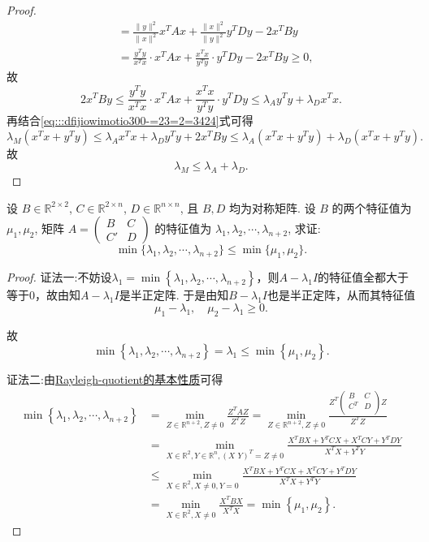 \documentclass[../../main.tex]{subfiles}%
\begin{document}
\begin{proof}
\begin{align*}
&= \frac{\| y \|^2}{\| x \|^2}x^T A x + \frac{\| x \|^2}{\| y \|^2}y^T D y - 2x^T B y \\
&= \frac{y^T y}{x^T x} \cdot x^T A x + \frac{x^T x}{y^T y} \cdot y^T D y - 2x^T B y \geqslant 0,
\end{align*}
故
$$2x^T B y \leqslant \frac{y^T y}{x^T x} \cdot x^T A x + \frac{x^T x}{y^T y} \cdot y^T D y \leqslant \lambda_A y^T y + \lambda_D x^T x.$$
再结合\eqref{eq:::dfijiowimotio300-=23=2=3424}式可得
$$\lambda_M (x^T x + y^T y) \leqslant \lambda_A x^T x + \lambda_D y^T y + 2x^T B y \leqslant \lambda_A (x^T x + y^T y) + \lambda_D (x^T x + y^T y).$$
故
$$\lambda_M \leqslant \lambda_A + \lambda_D.$$
\end{proof}

\begin{example}
设 $B \in \mathbb{R}^{2 \times 2}$, $C \in \mathbb{R}^{2 \times n}$, $D \in \mathbb{R}^{n \times n}$, 且 $B,D$ 均为对称矩阵. 设 $B$ 的两个特征值为 $\mu_1,\mu_2$, 矩阵 $A = \begin{pmatrix} B & C \\ C' & D \end{pmatrix}$ 的特征值为 $\lambda_1,\lambda_2,\cdots,\lambda_{n+2}$, 求证:
$$\min\{\lambda_1,\lambda_2,\cdots,\lambda_{n+2}\} \leqslant \min\{\mu_1,\mu_2\}.$$
\end{example}
\begin{proof}

{\color{blue}证法一:}不妨设$\lambda_1=\min\left\{ \lambda_1,\lambda_2,\cdots,\lambda_{n+2} \right\}$，则$A-\lambda_1 I$的特征值全都大于等于$0$，故由知$A-\lambda_1 I$是半正定阵.
于是由知$B-\lambda_1 I$也是半正定阵，从而其特征值
$$\mu_1-\lambda_1, \quad \mu_2-\lambda_1 \geqslant 0.$$

故
$$\min\left\{ \lambda_1,\lambda_2,\cdots,\lambda_{n+2} \right\}=\lambda_1 \leqslant \min\left\{ \mu_1,\mu_2 \right\}.$$

{\color{blue}证法二:}由\hyperref[proposition:Rayleigh-quotient瑞丽商的基本性质]{Rayleigh-quotient的基本性质}可得
\begin{align*}
\min \left\{ \lambda _1,\lambda _2,\cdots ,\lambda _{n+2} \right\} &=\underset{Z\in \mathbb{R} ^{n+2},Z\ne 0}{\min}\frac{Z^TAZ}{Z^TZ}=\underset{Z\in \mathbb{R} ^{n+2},Z\ne 0}{\min}\frac{Z^T\left( \begin{matrix}
B&		C\\
C^T&		D\\
\end{matrix} \right) Z}{Z^TZ}
\\
&=\underset{X\in \mathbb{R} ^2,Y\in \mathbb{R} ^n,\left( X\,\,Y \right) ^T=Z\ne 0}{\min}\frac{X^TBX+Y^TCX+X^TCY+Y^TDY}{X^TX+Y^TY}
\\
&\leqslant \underset{X\in \mathbb{R} ^2,X\ne 0,Y=0}{\min}\frac{X^TBX+Y^TCX+X^TCY+Y^TDY}{X^TX+Y^TY}
\\
&=\underset{X\in \mathbb{R} ^2,X\ne 0}{\min}\frac{X^TBX}{X^TX}=\min \left\{ \mu _1,\mu _2 \right\} .
\end{align*}
\end{proof}
\end{document}
